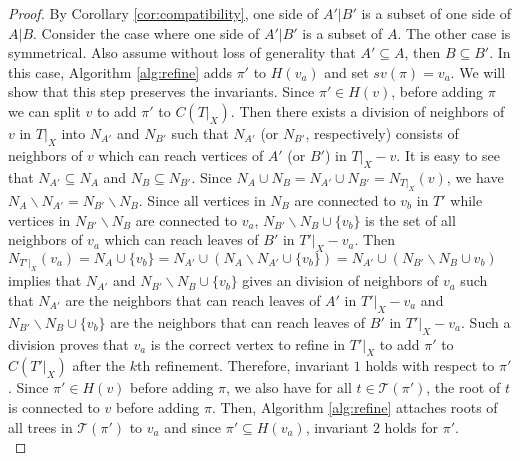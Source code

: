 \documentclass{bmcart}
\begin{document}
\begin{proof}
    By Corollary \ref{cor:compatibility}, one side of $A'|B'$ is a subset of one side of $A|B$. Consider the case where one side of $A'|B'$ is a subset of $A$. The other case is symmetrical. Also assume without loss of generality that $A' \subseteq A$, then $B \subseteq B'$. In this case, Algorithm \ref{alg:refine} adds $\pi'$ to $H(v_a)$ and set $sv(\pi) = v_a$. We will show that this step preserves the invariants. Since $\pi' \in H(v)$, before adding $\pi$ we can split $v$ to add $\pi'$ to $C(T|_X)$. Then there exists a division of neighbors of $v$ in $T|_X$ into $N_{A'}$ and $N_{B'}$ such that $N_{A'}$ (or $N_{B'}$, respectively) consists of neighbors of $v$ which can reach vertices of $A'$ (or $B'$) in $T|_X - v$. It is easy to see that $N_{A'} \subseteq N_A$ and $N_B \subseteq N_{B'}$. Since $N_A \cup N_B = N_{A'} \cup N_{B'} = N_{T|_X}(v)$, we have $N_A \backslash N_{A'} = N_{B'} \backslash N_B$. Since all vertices in $N_B$ are connected to $v_b$ in $T'$ while vertices in $N_{B'} \backslash N_B$ are connected to $v_a$, $N_{B'} \backslash N_B \cup \{v_b\}$ is the set of all neighbors of $v_a$ which can reach leaves of $B'$ in $T'|_X - v_a$. Then $N_{T'|_X}(v_a) = N_A \cup \{v_b\} = N_{A'} \cup (N_A \backslash N_{A'} \cup \{v_b\}) = N_{A'} \cup (N_{B'} \backslash N_B \cup v_b)$ implies that $N_{A'}$ and $N_{B'} \backslash N_B \cup \{v_b\}$ gives an division of neighbors of $v_a$ such that $N_{A'}$ are the neighbors that can reach leaves of $A'$ in $T'|_X -v_a$ and $N_{B'} \backslash N_B \cup \{v_b\}$ are the neighbors that can reach leaves of $B'$ in $T'|_X -v_a$. Such a division proves that $v_a$ is the correct vertex to refine in $T'|_X$ to add $\pi'$ to $C(T'|_X)$ after the $k$th refinement. Therefore, invariant $1$ holds with respect to $\pi'$. Since $\pi' \in H(v)$ before adding $\pi$, we also have for all $t \in \mathcal{T}(\pi')$, the root of $t$ is connected to $v$ before adding $\pi$. Then, Algorithm \ref{alg:refine} attaches roots of all trees in $\mathcal{T}(\pi')$ to $v_a$ and since $\pi' \subseteq H(v_a)$, invariant $2$ holds for $\pi'$. \\


\end{proof}
\end{document}
